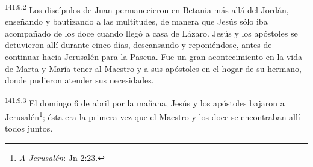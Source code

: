 \par
\textsuperscript{141:9.2} Los discípulos de Juan permanecieron en Betania más allá del Jordán, enseñando y bautizando a las multitudes, de manera que Jesús sólo iba acompañado de los doce cuando llegó a casa de Lázaro. Jesús y los apóstoles se detuvieron allí durante cinco días, descansando y reponiéndose, antes de continuar hacia Jerusalén para la Pascua. Fue un gran acontecimiento en la vida de Marta y María tener al Maestro y a sus apóstoles en el hogar de su hermano, donde pudieron atender sus necesidades.

\par
\textsuperscript{141:9.3} El domingo 6 de abril por la mañana, Jesús y los apóstoles bajaron a Jerusalén\footnote{\textit{A Jerusalén}: Jn 2:23.}; ésta era la primera vez que el Maestro y los doce se encontraban allí todos juntos.